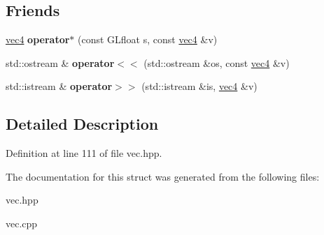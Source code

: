 \subsection*{\-Friends}
\begin{DoxyCompactItemize}
\item 
\hypertarget{struct_angel_1_1vec4_a18b1a91dc4c502220d099d6d85e504bc}{\hyperlink{struct_angel_1_1vec4}{vec4} {\bfseries operator$\ast$} (const \-G\-Lfloat s, const \hyperlink{struct_angel_1_1vec4}{vec4} \&v)}\label{struct_angel_1_1vec4_a18b1a91dc4c502220d099d6d85e504bc}

\item 
\hypertarget{struct_angel_1_1vec4_afadcf8884205c469256e4be7d96bfa12}{std\-::ostream \& {\bfseries operator$<$$<$} (std\-::ostream \&os, const \hyperlink{struct_angel_1_1vec4}{vec4} \&v)}\label{struct_angel_1_1vec4_afadcf8884205c469256e4be7d96bfa12}

\item 
\hypertarget{struct_angel_1_1vec4_ada396ae1c4ef513c6baf301f20f89bfa}{std\-::istream \& {\bfseries operator$>$$>$} (std\-::istream \&is, \hyperlink{struct_angel_1_1vec4}{vec4} \&v)}\label{struct_angel_1_1vec4_ada396ae1c4ef513c6baf301f20f89bfa}

\end{DoxyCompactItemize}


\subsection{\-Detailed \-Description}


\-Definition at line 111 of file vec.\-hpp.



\-The documentation for this struct was generated from the following files\-:\begin{DoxyCompactItemize}
\item 
vec.\-hpp\item 
vec.\-cpp\end{DoxyCompactItemize}
